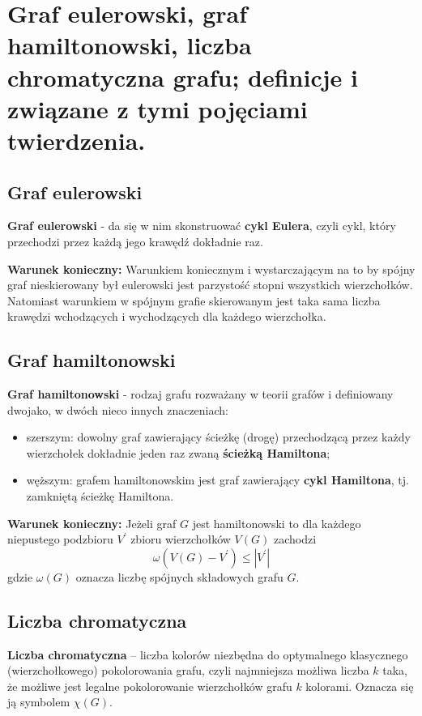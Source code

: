 \section{Graf eulerowski, graf hamiltonowski, liczba chromatyczna grafu; definicje i związane z tymi pojęciami twierdzenia.}

\subsection{Graf eulerowski}
\textbf{Graf eulerowski} - da się w nim skonstruować \textbf{cykl Eulera}, czyli cykl,
który przechodzi przez każdą jego krawędź dokładnie raz.

\textbf{Warunek konieczny:} Warunkiem koniecznym i wystarczającym na to by spójny graf nieskierowany był eulerowski jest parzystość stopni wszystkich wierzchołków.
Natomiast warunkiem w spójnym grafie skierowanym jest taka sama liczba krawędzi wchodzących i wychodzących dla każdego wierzchołka.

\subsection{Graf hamiltonowski}
\textbf{Graf hamiltonowski} - rodzaj grafu rozważany w teorii grafów i definiowany dwojako, w dwóch nieco innych znaczeniach:
\begin{itemize}[itemsep=0pt,partopsep=0pt, parsep=0pt]
    \item szerszym: dowolny graf zawierający ścieżkę (drogę) przechodzącą przez każdy wierzchołek dokładnie jeden raz zwaną \textbf{ścieżką Hamiltona};
    \item węższym: grafem hamiltonowskim jest graf zawierający \textbf{cykl Hamiltona}, tj. zamkniętą ścieżkę Hamiltona.
\end{itemize}

\textbf{Warunek konieczny:} Jeżeli graf $G$ jest hamiltonowski to dla każdego niepustego podzbioru $V^{\prime}$ zbioru wierzchołków $V(G)$ zachodzi
\[
    \omega(V(G) - V^{\prime}) \leqslant \left| V^{\prime} \right|
\]
gdzie $\omega (G)$ oznacza liczbę spójnych składowych grafu $G$.

\subsection{Liczba chromatyczna}

\textbf{Liczba chromatyczna} – liczba kolorów niezbędna do optymalnego klasycznego (wierzchołkowego) pokolorowania grafu,
czyli najmniejsza możliwa liczba $k$ taka, że możliwe jest legalne pokolorowanie wierzchołków grafu $k$ kolorami.
Oznacza się ją symbolem $\chi (G)$.

